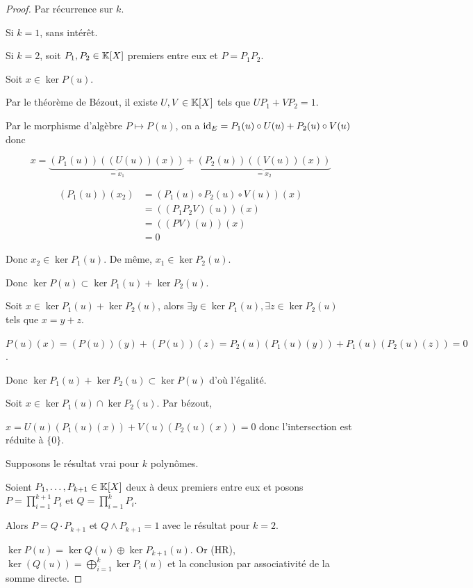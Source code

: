 
\begin{proof}
    Par récurrence sur $k$. 

    Si $k = 1$, sans intérêt. 

    Si $k = 2$, soit $P_1, P_2 \in \mathbb{K}[X]$ premiers entre eux et $P = P_1 P_2$.

    Soit $x \in \ker P(u)$. 

    Par le théorème de Bézout, il existe $U, V \in \mathbb{K}[X]$ tels que $U P_1 + V P_2 = 1$.

    Par le morphisme d'algèbre $P \mapsto P(u)$, on a 
    $\operatorname{id}_E = P_1(u) \circ U(u) + P_2(u) \circ V(u)$ donc 

    $$x = \underbrace{(P_1(u))((U(u))(x))}_{= x_1} + \underbrace{(P_2(u))((V(u))(x))}_{= x_2}$$

    \begin{align}
        (P_1(u))(x_2) & = (P_1(u) \circ P_2(u) \circ V(u))(x) \\
        & = ((P_1 P_2V)(u))(x) \\
        & = ((PV)(u))(x) \\
        & = 0
    \end{align}

    Donc $x_2 \in \ker P_1(u)$. De même, $x_1 \in \ker P_2(u)$.

    Donc $\ker P(u) \subset \ker P_1(u) + \ker P_2(u)$.


    \lvspace Soit $x \in \ker P_1(u) + \ker P_2(u)$, alors $\exists y \in \ker P_1 (u), 
    \exists z \in \ker P_2(u)$ tels que $x = y + z$.

    $P(u)(x) = (P(u))(y) + (P(u))(z) = P_2(u)(P_1(u)(y)) + P_1(u)(P_2(u)(z)) = 0$. 

    Donc $\ker P_1 (u) + \ker P_2(u) \subset \ker P(u)$ d'où l'égalité. 

    Soit $x \in \ker P_1(u) \cap \ker P_2(u)$. Par bézout, 

    $x = U(u)(P_1(u)(x)) + V(u)(P_2(u)(x)) = 0$ donc l'intersection est réduite à $\{0\}$.

     Supposons le résultat vrai pour $k$ polynômes. 

    Soient $P_1, \dots, P_{k + 1} \in \mathbb{K}[X]$ deux à deux premiers entre eux et posons 
    $P = \displaystyle \prod_{i = 1}^{ k + 1 } P_i$ et $Q = \displaystyle \prod_{i = 1 }^{ k } P_i$.

    Alors $P = Q \cdot P_{k + 1}$ et $Q \wedge P_{k + 1} = 1$ avec le résultat pour $k = 2$.

    $\ker P(u) = \ker Q(u) \oplus \ker P_{k + 1}(u)$. Or (HR), 
    $\ker(Q(u)) = \bigoplus_{i = 1 }^{ k } \ker P_i(u)$ et la conclusion par associativité de 
    la somme directe.
\end{proof}



